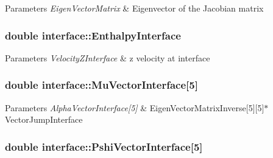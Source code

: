 \begin{DoxyParams}{Parameters}
{\em Eigen\+Vector\+Matrix} & Eigenvector of the Jacobian matrix \\
\hline
\end{DoxyParams}
\subsubsection[{\texorpdfstring{Enthalpy\+Interface}{EnthalpyInterface}}]{\setlength{\rightskip}{0pt plus 5cm}double interface\+::\+Enthalpy\+Interface}\hypertarget{classinterface_af2f6d43336396abc20bd88521e489a71}{}\label{classinterface_af2f6d43336396abc20bd88521e489a71}

\begin{DoxyParams}{Parameters}
{\em Velocity\+Z\+Interface} & z velocity at interface \\
\hline
\end{DoxyParams}
\subsubsection[{\texorpdfstring{Mu\+Vector\+Interface}{MuVectorInterface}}]{\setlength{\rightskip}{0pt plus 5cm}double interface\+::\+Mu\+Vector\+Interface\mbox{[}5\mbox{]}}\hypertarget{classinterface_aa740f1171fcddcb604c237cabbcebc1a}{}\label{classinterface_aa740f1171fcddcb604c237cabbcebc1a}

\begin{DoxyParams}{Parameters}
{\em Alpha\+Vector\+Interface\mbox{[}5\mbox{]}} & Eigen\+Vector\+Matrix\+Inverse\mbox{[}5\mbox{]}\mbox{[}5\mbox{]}$\ast$\+Vector\+Jump\+Interface \\
\hline
\end{DoxyParams}
\subsubsection[{\texorpdfstring{Pshi\+Vector\+Interface}{PshiVectorInterface}}]{\setlength{\rightskip}{0pt plus 5cm}double interface\+::\+Pshi\+Vector\+Interface\mbox{[}5\mbox{]}}\hypertarget{classinterface_a37044e7a6a8820ea4bcbcaf969628238}{}\label{classinterface_a37044e7a6a8820ea4bcbcaf969628238}

